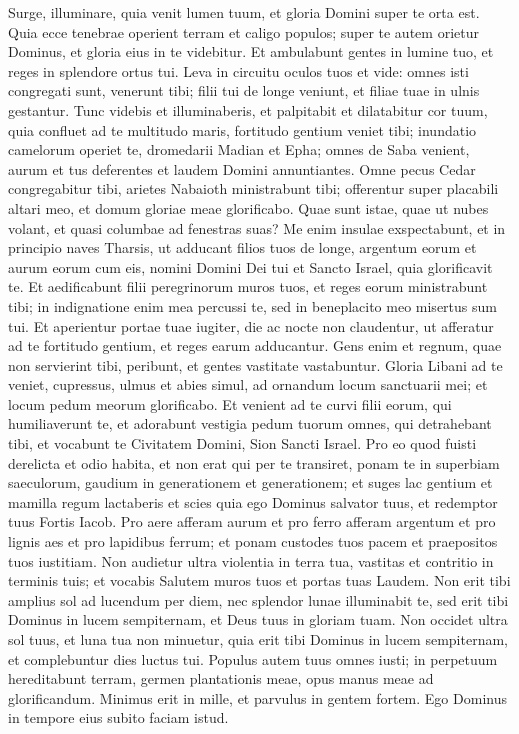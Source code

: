 \begin{biblechapter}  
\verse Surge, illuminare, quia venit lumen tuum, et gloria Domini super te orta est. 
\verse Quia ecce tenebrae operient terram et caligo populos; super te autem orietur Dominus, et gloria eius in te videbitur. 
\verse Et ambulabunt gentes in lumine tuo, et reges in splendore ortus tui. 
\verse Leva in circuitu oculos tuos et vide: omnes isti congregati sunt, venerunt tibi; filii tui de longe veniunt, et filiae tuae in ulnis gestantur. 
\verse Tunc videbis et illuminaberis, et palpitabit et dilatabitur cor tuum, quia confluet ad te multitudo maris, fortitudo gentium veniet tibi; 
\verse inundatio camelorum operiet te, dromedarii Madian et Epha; omnes de Saba venient, aurum et tus deferentes et laudem Domini annuntiantes. 
\verse Omne pecus Cedar congregabitur tibi, arietes Nabaioth ministrabunt tibi; offerentur super placabili altari meo, et domum gloriae meae glorificabo. 
\verse Quae sunt istae, quae ut nubes volant, et quasi columbae ad fenestras suas? 
\verse Me enim insulae exspectabunt, et in principio naves Tharsis, ut adducant filios tuos de longe, argentum eorum et aurum eorum cum eis, nomini Domini Dei tui et Sancto Israel, quia glorificavit te. 
\verse Et aedificabunt filii peregrinorum muros tuos, et reges eorum ministrabunt tibi; in indignatione enim mea percussi te, sed in beneplacito meo misertus sum tui. 
\verse Et aperientur portae tuae iugiter, die ac nocte non claudentur, ut afferatur ad te fortitudo gentium, et reges earum adducantur. 
\verse Gens enim et regnum, quae non servierint tibi, peribunt, et gentes vastitate vastabuntur. 
\verse Gloria Libani ad te veniet, cupressus, ulmus et abies simul, ad ornandum locum sanctuarii mei; et locum pedum meorum glorificabo. 
\verse Et venient ad te curvi filii eorum, qui humiliaverunt te, et adorabunt vestigia pedum tuorum omnes, qui detrahebant tibi, et vocabunt te Civitatem Domini, Sion Sancti Israel. 
\verse Pro eo quod fuisti derelicta et odio habita, et non erat qui per te transiret, ponam te in superbiam saeculorum, gaudium in generationem et generationem; 
\verse et suges lac gentium et mamilla regum lactaberis et scies quia ego Dominus salvator tuus, et redemptor tuus Fortis Iacob. 
\verse Pro aere afferam aurum et pro ferro afferam argentum et pro lignis aes et pro lapidibus ferrum; et ponam custodes tuos pacem et praepositos tuos iustitiam. 
\verse Non audietur ultra violentia in terra tua, vastitas et contritio in terminis tuis; et vocabis Salutem muros tuos et portas tuas Laudem. 
\verse Non erit tibi amplius sol ad lucendum per diem, nec splendor lunae illuminabit te, sed erit tibi Dominus in lucem sempiternam, et Deus tuus in gloriam tuam. 
\verse Non occidet ultra sol tuus, et luna tua non minuetur, quia erit tibi Dominus in lucem sempiternam, et complebuntur dies luctus tui. 
\verse Populus autem tuus omnes iusti; in perpetuum hereditabunt terram, germen plantationis meae, opus manus meae ad glorificandum. 
\verse Minimus erit in mille, et parvulus in gentem fortem. Ego Dominus in tempore eius subito faciam istud. 
\end{biblechapter}

